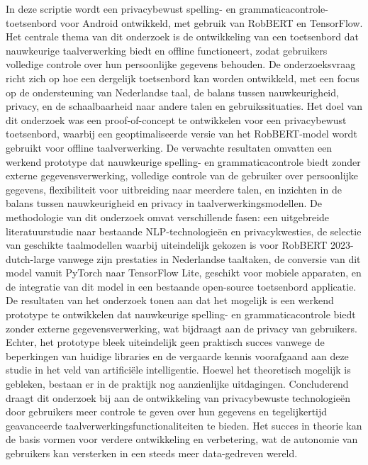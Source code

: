 In deze scriptie wordt een privacybewust spelling- en grammaticacontrole-toet\-sen\-bord voor Android ontwikkeld, met gebruik van RobBERT en TensorFlow. Het centrale thema van dit onderzoek is de ontwikkeling van een toetsenbord dat nauwkeurige taalverwerking biedt en offline functioneert, zodat gebruikers volledige controle over hun persoonlijke gegevens behouden. De onderzoeksvraag richt zich op hoe een dergelijk toetsenbord kan worden ontwikkeld, met een focus op de ondersteuning van Nederlandse taal, de balans tussen nauwkeurigheid, privacy, en de schaalbaarheid naar andere talen en gebruikssituaties.
Het doel van dit onderzoek was een proof-of-concept te ontwikkelen voor een privacybewust toetsenbord, waarbij een geoptimaliseerde versie van het RobBERT-model wordt gebruikt voor offline taalverwerking. De verwachte resultaten omvatten een werkend prototype dat nauwkeurige spelling- en grammaticacontrole biedt zonder externe gegevensverwerking, volledige controle van de gebruiker over persoonlijke gegevens, flexibiliteit voor uitbreiding naar meerdere talen, en inzichten in de balans tussen nauwkeurigheid en privacy in taalverwerkingsmodellen.
De methodologie van dit onderzoek omvat verschillende fasen: een uitgebreide literatuurstudie naar bestaande NLP-technologieën en privacykwesties, de selectie van geschikte taalmodellen waarbij uiteindelijk gekozen is voor RobBERT 2023-dutch-large vanwege zijn prestaties in Nederlandse taaltaken, de conversie van dit model vanuit PyTorch naar TensorFlow Lite, geschikt voor mobiele apparaten, en de integratie van dit model in een bestaande open-source toetsenbord applicatie.
De resultaten van het onderzoek tonen aan dat het mogelijk is een werkend prototype te ontwikkelen dat nauwkeurige spelling- en grammaticacontrole biedt zonder externe gegevensverwerking, wat bijdraagt aan de privacy van gebruikers. Echter, het prototype bleek uiteindelijk geen praktisch succes vanwege de beperkingen van huidige libraries en de vergaarde kennis voorafgaand aan deze studie in het veld van artificiële intelligentie. Hoewel het theoretisch mogelijk is gebleken, bestaan er in de praktijk nog aanzienlijke uitdagingen.
Concluderend draagt dit onderzoek bij aan de ontwikkeling van privacybewuste technologieën door gebruikers meer controle te geven over hun gegevens en tegelijkertijd geavanceerde taalverwerkingsfunctionaliteiten te bieden. Het succes in theorie kan de basis vormen voor verdere ontwikkeling en verbetering, wat de autonomie van gebruikers kan versterken in een steeds meer data-gedreven wereld.
